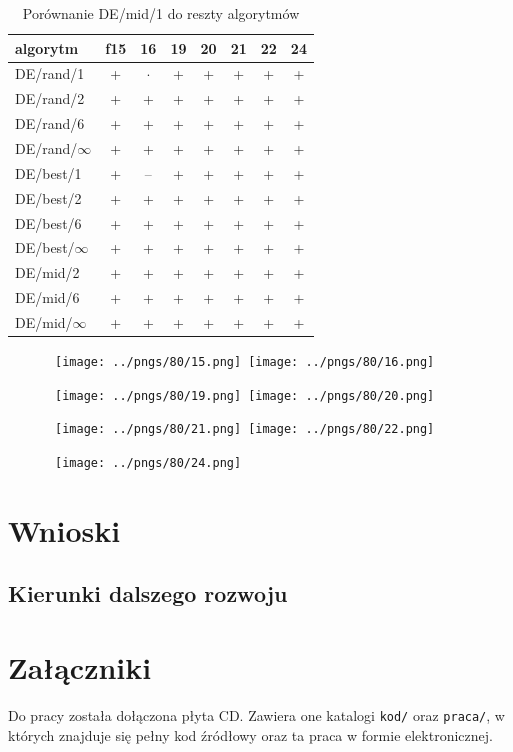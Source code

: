 \documentclass[a4paper,onecolumn,oneside,11pt,wide,floatssmall]{mwrep}
\theoremstyle{definition}
\theoremstyle{plain}%
\theoremstyle{remark}
\begin{document}
\begin{table}[H]
\centering
\begin{tabular}{ l | c | c | c | c | c | c | c }
algorytm         &f15& 16& 19& 20& 21& 22& 24 \\ \hline
DE/rand/1	 & + & $\cdot$ & + & + & + & + & + \\
DE/rand/2	 & + & + & + & + & + & + & + \\
DE/rand/6	 & + & + & + & + & + & + & + \\
DE/rand/$\infty$	 & + & + & + & + & + & + & + \\
DE/best/1	 & + & -- & + & + & + & + & + \\
DE/best/2	 & + & + & + & + & + & + & + \\
DE/best/6	 & + & + & + & + & + & + & + \\
DE/best/$\infty$	 & + & + & + & + & + & + & + \\
DE/mid/2	 & + & + & + & + & + & + & + \\
DE/mid/6	 & + & + & + & + & + & + & + \\
DE/mid/$\infty$	 & + & + & + & + & + & + & + \\
\end{tabular}
\caption{Porównanie DE/mid/1 do reszty algorytmów}
\end{table}

\begin{figure}[H]
\centering
\mbox{
\texttt{[image: ../pngs/80/15.png]} \quad
\texttt{[image: ../pngs/80/16.png]} 
}
\end{figure}

\begin{figure}[H]
\centering
\mbox{
\texttt{[image: ../pngs/80/19.png]} \quad
\texttt{[image: ../pngs/80/20.png]} 
}
\end{figure}

\begin{figure}[H]
\centering
\mbox{
\texttt{[image: ../pngs/80/21.png]} \quad
\texttt{[image: ../pngs/80/22.png]} 
}
\end{figure}

\begin{figure}[H]
\centering
\mbox{
\texttt{[image: ../pngs/80/24.png]} \quad
}
\end{figure}

\chapter{Wnioski}

\section{Kierunki dalszego rozwoju}

\appendix

\chapter{Załączniki}

Do pracy została dołączona płyta CD. Zawiera one katalogi \texttt{kod/} oraz \texttt{praca/},
w których znajduje się pełny kod źródłowy oraz ta praca w formie elektronicznej.

\nocite{*}


\end{document}
